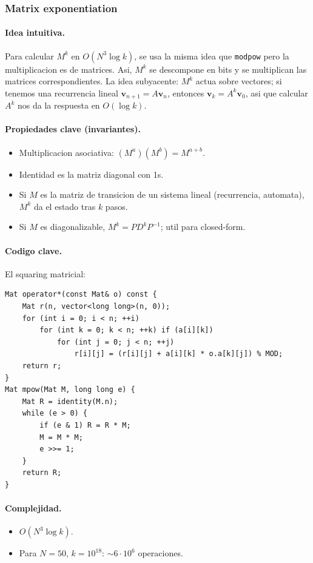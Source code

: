 ﻿\subsubsection{Matrix exponentiation}

\paragraph{Idea intuitiva.}
Para calcular $M^k$ en $O(N^3 \log k)$, se usa la misma idea que \texttt{modpow} pero la multiplicacion es de matrices. Asi, $M^k$ se descompone en bits y se multiplican las matrices correspondientes. La idea subyacente: $M^k$ actua sobre vectores; si tenemos una recurrencia lineal $\mathbf{v}_{n+1} = A \mathbf{v}_n$, entonces $\mathbf{v}_k = A^k \mathbf{v}_0$, asi que calcular $A^k$ nos da la respuesta en $O(\log k)$.

\paragraph{Propiedades clave (invariantes).}
\begin{itemize}\setlength\itemsep{0pt}
	\item Multiplicacion asociativa: $(M^a)(M^b) = M^{a+b}$.
	\item Identidad es la matriz diagonal con 1s.
	\item Si $M$ es la matriz de transicion de un sistema lineal (recurrencia, automata), $M^k$ da el estado tras $k$ pasos.
	\item Si $M$ es diagonalizable, $M^k = P D^k P^{-1}$; util para closed-form.
\end{itemize}

\paragraph{Codigo clave.}
El squaring matricial:
\begin{verbatim}
Mat operator*(const Mat& o) const {
    Mat r(n, vector<long long>(n, 0));
    for (int i = 0; i < n; ++i)
        for (int k = 0; k < n; ++k) if (a[i][k])
            for (int j = 0; j < n; ++j)
                r[i][j] = (r[i][j] + a[i][k] * o.a[k][j]) % MOD;
    return r;
}
Mat mpow(Mat M, long long e) {
    Mat R = identity(M.n);
    while (e > 0) {
        if (e & 1) R = R * M;
        M = M * M;
        e >>= 1;
    }
    return R;
}
\end{verbatim}

\paragraph{Complejidad.}
\begin{itemize}\setlength\itemsep{0pt}
	\item $O(N^3 \log k)$.
	\item Para $N = 50$, $k = 10^{18}$: $\sim 6 \cdot 10^6$ operaciones.
\end{itemize}

